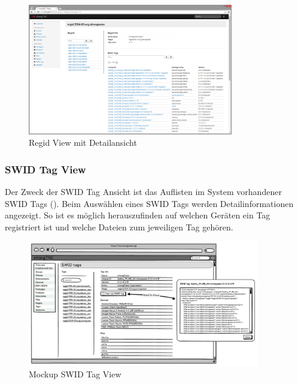 \begin{figure}[H]
	\centering
	\includegraphics[width=0.8\textwidth]{./images/Views/regid-view}
	\caption{Regid View mit Detailansicht}
	\label{fig:regid-view}
\end{figure}


\subsubsection{SWID Tag View}
Der Zweck der SWID Tag Ansicht ist das Auflisten im System vorhandener SWID Tags
(). Beim Auswählen eines SWID Tags werden
Detailinformationen angezeigt. So ist es möglich herauszufinden auf welchen
Geräten ein Tag registriert ist und welche Dateien zum jeweiligen Tag gehören.

\begin{figure}[H]
	\centering
	\includegraphics[width=0.9\textwidth]{./images/mockups/swid-tag-view}
	\caption{Mockup SWID Tag View}
	\label{fig:swid-tag-view-mockup}
\end{figure}

